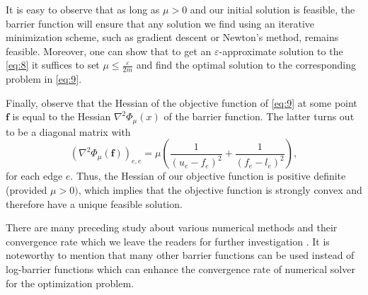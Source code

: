 \documentclass{article} %
\theoremstyle{bfnote}
\begin{document}
%


It is easy to observe that as long as $\mu>0$ and our initial solution is feasible, the barrier function will ensure that any solution we find using an iterative minimization scheme, such as gradient descent or Newton's method, remains feasible. Moreover, one can show that to get an $\varepsilon$-approximate solution to the \cref{eq:8} it suffices to set $\mu \leq \frac{\varepsilon}{2 m}$ and find the optimal solution to the corresponding problem in \cref{eq:9}.\citep{boyd2004, bubeck2015}

Finally, observe that the Hessian of the objective function of \cref{eq:9} at some point $\bm{f}$ is equal to the Hessian $\nabla^2 \Phi_\mu(x)$ of the barrier function. The latter turns out to be a diagonal matrix with
\begin{equation*}
	\left(\nabla^2 \Phi_\mu(\bm{f})\right)_{e, e}=\mu\left(\frac{1}{\left(u_e-f_e\right)^2}+\frac{1}{\left(f_e-l_e\right)^2}\right),
\end{equation*}
for each edge $e$. Thus, the Hessian of our objective function is positive definite (provided $\mu>0)$, which implies that the objective function is strongly convex and therefore have a unique feasible solution.

There are many preceding study about various numerical methods and their convergence rate which we leave the readers for further investigation \citep{bertsimas1997, boyd2004, bubeck2015}. It is noteworthy to mention that many other barrier functions can be used instead of log-barrier functions which can enhance the convergence rate of numerical solver for the optimization problem. \citep{cohen2020, lee2020, axiotis2022, brand2021c, chen2022a}
\end{document}
